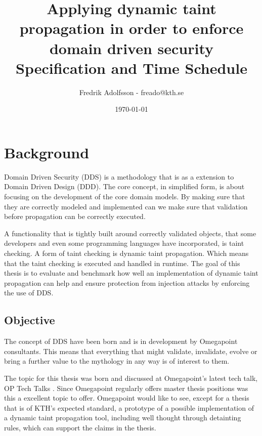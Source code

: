\documentclass{../kththesis}
\title{Applying dynamic taint propagation in order to enforce domain driven security \\
        \large Specification and Time Schedule}
\author{Fredrik Adolfsson - freado@kth.se}
\date{\today}
\begin{document}
\frontmatter


\titlepage


\tableofcontents


\mainmatter



\chapter{Background}
Domain Driven Security (DDS) is a methodology that is as a extension to Domain Driven Design (DDD). The core concept, in simplified form, is about focusing on the development of the core domain models. By making sure that they are correctly modeled and implemented can we make sure that validation before propagation can be correctly executed. \parencite{evans_2015, EvansEric2004Dd:t, Wilander2009, Johnsson2009}

A functionality that is tightly built around correctly validated objects, that some developers and even some programming languages have incorporated, is taint checking. \parencite{perl, ruby, Clause2007} A form of taint checking is dynamic taint propagation. Which means that the taint checking is executed and handled in runtime. The goal of this thesis is to evaluate and benchmark how well an implementation of dynamic taint propagation can help and ensure protection from injection attacks by enforcing the use of DDS. 


\section{Objective}
The concept of DDS have been born and is in development by Omegapoint consultants. This means that everything that might validate, invalidate, evolve or bring a further value to the mythology in any way is of interest to them. 

The topic for this thesis was born and discussed at Omegapoint's latest tech talk, OP Tech Talks \parencite{Tardell}. Since Omegapoint regularly offers master thesis positions was this a excellent topic to offer. Omegapoint would like to see, except for a thesis that is of KTH's expected standard, a prototype of a possible implementation of a dynamic taint propagation tool, including well thought through detainting rules, which can support the claims in the thesis.
\end{document}

